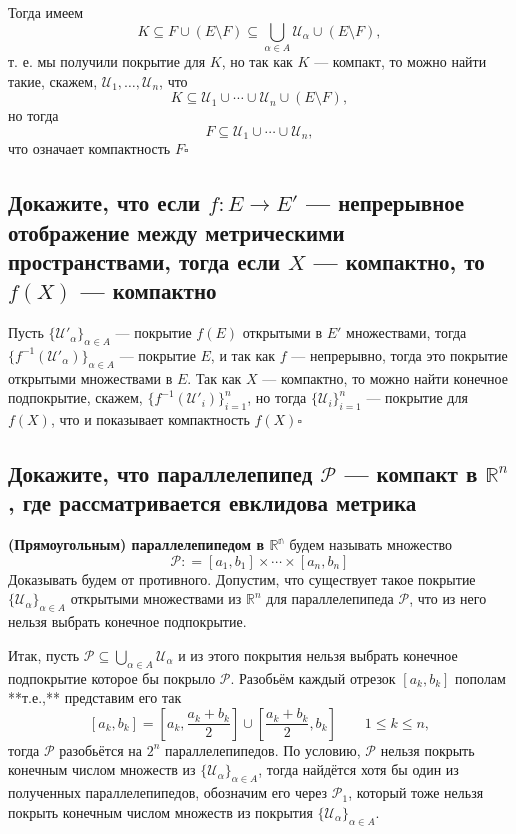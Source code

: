 \documentclass[a4paper]{article}
\newcommand{\qed}{\hfill$\square$}
\begin{document}
Тогда имеем
$$
K \subseteq F \cup (E \setminus F) \subseteq \bigcup_{\alpha \in A} \mathscr{U}_\alpha \cup (E \setminus F),
$$
т. е. мы получили покрытие для $K$, но так как $K$ — компакт, то можно найти такие, скажем, $\mathscr{U}_1, \ldots, \mathscr{U}_n$, что 
$$
K \subseteq \mathscr{U}_1 \cup \cdots \cup \mathscr{U}_n \cup (E \setminus F),
$$
но тогда 
$$
F \subseteq \mathscr{U}_1 \cup \cdots \cup \mathscr{U}_n,
$$
что означает компактность $F$\qed

\subsection{Докажите, что если $f:E\to E'$ — непрерывное отображение между метрическими пространствами, тогда если $X$ — компактно, то $f(X)$ — компактно}
Пусть $\{\mathscr{U}'_\alpha\}_{\alpha \in A}$ — покрытие $f(E)$ открытыми в $E'$ множествами, тогда $\{f^{-1}(\mathscr{U}'_\alpha)\}_{\alpha \in A}$ — покрытие $E$, и так как $f$ — непрерывно, тогда это покрытие открытыми множествами в $E.$ Так как $X$ — компактно, то можно найти конечное подпокрытие, скажем, $\{f^{-1}(\mathscr{U}'_i)\}_{i=1}^n$, но тогда $\{\mathscr{U}_i\}_{i=1}^n$ — покрытие для $f(X)$, что и показывает компактность $f(X)$\qed
\label{2.8}


\subsection{Докажите, что параллелепипед $\mathcal{P}$ — компакт в $\mathbb{R}^{n}$, где рассматривается евклидова метрика}
\textbf{(Прямоугольным) параллелепипедом в $\mathbb{R^n}$} будем называть множество 
$$
\mathcal{P}: = [a_1, b_1] \times \cdots \times [a_n, b_n]
$$
Доказывать будем от противного. Допустим, что существует такое покрытие $\{\mathscr{U}_\alpha\}_{\alpha \in A}$ открытыми множествами из $\mathbb{R}^n$ для параллелепипеда $\mathcal{P}$, что из него нельзя выбрать конечное подпокрытие. 
\label{2.9}

Итак, пусть $\mathcal{P} \subseteq \bigcup_{\alpha \in A} \mathscr{U}_\alpha$ и из этого покрытия нельзя выбрать конечное подпокрытие которое бы покрыло $\mathcal{P}$. Разобьём каждый отрезок $[a_k, b_k]$ пополам **т.е.,** представим его так
$$
[a_k, b_k] = \left[ a_k, \frac{a_k+b_k}{2} \right] \cup \left[\frac{a_k +b_k}{2}, b_k \right] \qquad 1 \le k \le n,
$$
тогда $\mathcal{P}$ разобьётся на $2^n$ параллелепипедов. По условию, $\mathcal{P}$ нельзя покрыть конечным числом множеств из $\{ \mathscr{U}_\alpha\}_{\alpha \in A}$, тогда найдётся хотя бы один из полученных параллелепипедов, обозначим его через $\mathcal{P}_1$, который тоже нельзя покрыть конечным числом множеств из покрытия $\{ \mathscr{U}_\alpha\}_{\alpha \in A}$.
\end{document}
